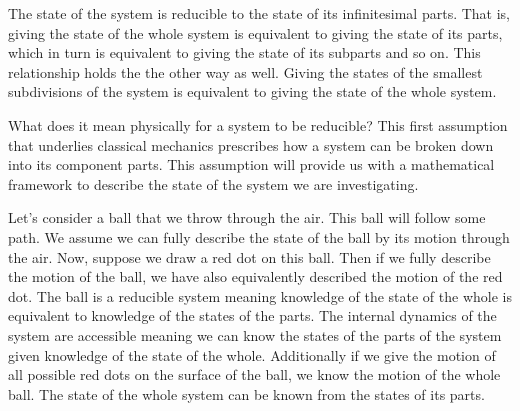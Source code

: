 \documentclass{article}[a4paper]
\begin{document}
\begin{assump}
	The state of the system is reducible to the state of its infinitesimal parts. That is, giving the state of the whole system is equivalent to giving the state of its parts, which in turn is equivalent to giving the state of its subparts and so on. This relationship holds the the other way as well. Giving the states of the smallest subdivisions of the system is equivalent to giving the state of the whole system.
\end{assump}
	
	
	What does it mean physically for a system to be reducible? This first assumption that underlies classical mechanics prescribes how a system can be broken down into its component parts. This assumption will provide us with a mathematical framework to describe the state of the system we are investigating.
	
	Let's consider a ball that we throw through the air. This ball will follow some path. We assume we can fully describe the state of the ball by its motion through the air. Now, suppose we draw a red dot on this ball. Then if we fully describe the motion of the ball, we have also equivalently described the motion of the red dot. The ball is a reducible system meaning knowledge of the state of the whole is equivalent to knowledge of the states of the parts. The internal dynamics of the system are accessible meaning we can know the states of the parts of the system given knowledge of the state of the whole. Additionally if we give the motion of all possible red dots on the surface of the ball, we know the motion of the whole ball. The state of the whole system can be known from the states of its parts. 
\end{document}

